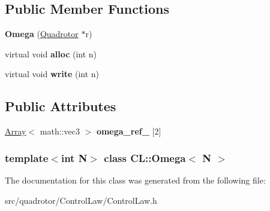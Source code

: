 \subsection*{\-Public \-Member \-Functions}
\begin{DoxyCompactItemize}
\item 
\hypertarget{classCL_1_1Omega_afcbb238467282d3addd88508937fe37c}{{\bfseries \-Omega} (\hyperlink{classQuadrotor}{\-Quadrotor} $\ast$r)}\label{classCL_1_1Omega_afcbb238467282d3addd88508937fe37c}

\item 
\hypertarget{classCL_1_1Omega_a68c53ed2e6669dec2f66517fcb42f92e}{virtual void {\bfseries alloc} (int n)}\label{classCL_1_1Omega_a68c53ed2e6669dec2f66517fcb42f92e}

\item 
\hypertarget{classCL_1_1Omega_ade07f74d9a84305b7be781911a1b0930}{virtual void {\bfseries write} (int n)}\label{classCL_1_1Omega_ade07f74d9a84305b7be781911a1b0930}

\end{DoxyCompactItemize}
\subsection*{\-Public \-Attributes}
\begin{DoxyCompactItemize}
\item 
\hypertarget{classCL_1_1Omega_afb1f31f1519495a3e0e9d3fe22b09bd0}{\hyperlink{classArray}{\-Array}$<$ math\-::vec3 $>$ {\bfseries omega\-\_\-ref\-\_\-} \mbox{[}2\mbox{]}}\label{classCL_1_1Omega_afb1f31f1519495a3e0e9d3fe22b09bd0}

\end{DoxyCompactItemize}
\subsubsection*{template$<$int \-N$>$ class C\-L\-::\-Omega$<$ N $>$}



\-The documentation for this class was generated from the following file\-:\begin{DoxyCompactItemize}
\item 
src/quadrotor/\-Control\-Law/\-Control\-Law.\-h\end{DoxyCompactItemize}
